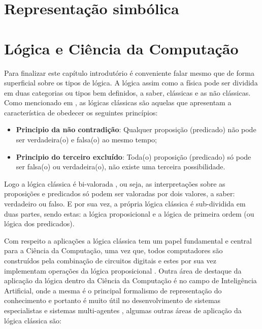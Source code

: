 \section{Representação simbólica}\label{sec:Representacao-simbolica}

\section{Lógica e Ciência da Computação}\label{sec:Tipos-Logica-Aplicacoes}


Para finalizar este capítulo introdutório é conveniente falar mesmo que de forma superficial sobre os tipos de lógica. A lógica assim como a física pode ser dividida em duas categorias ou tipos bem definidos, a saber, clássicas e as não
clássicas. Como mencionado em  \cite{BenjaV1, edgar2002}, as lógicas clássicas são aquelas que apresentam a característica de obedecer os seguintes princípios: 

\begin{itemize}
	\item \textbf{Principio da não contradição}: Qualquer proposição (predicado) não pode ser verdadeira(o) e falsa(o) ao mesmo tempo;
	\item \textbf{Principio do terceiro excluído}: Toda(o) proposição  (predicado) só pode ser falsa(o) ou verdadeira(o), não existe uma terceira possibilidade. 
\end{itemize}

Logo a lógica clássica é bi-valorada \cite{edgar2002}, ou seja, as interpretações sobre as proposições e predicados só podem ser valoradas por dois valores, a saber: verdadeiro ou falso. E por sua vez, a própria lógica clássica é sub-dividida em duas partes, sendo estas: a lógica proposicional e a lógica de primeira ordem (ou lógica dos predicados).

Com respeito a aplicações a lógica clássica tem um papel fundamental e central para a Ciência da Computação, uma vez que, todos computadores são construídos pela combinação de circuitos digitais e estes por sua vez implementam operações da lógica proposicional \cite{abe2002-logica, nunes2008}. Outra área de destaque da aplicação da lógica dentro da Ciência da Computação é no campo de Inteligência Artificial, onde a mesma é o principal formalismo de representação do conhecimento e portanto é muito útil no desenvolvimento de sistemas especialistas e sistemas multi-agentes \cite{BenjaV1}, algumas outras áreas de aplicação da lógica clássica são:

